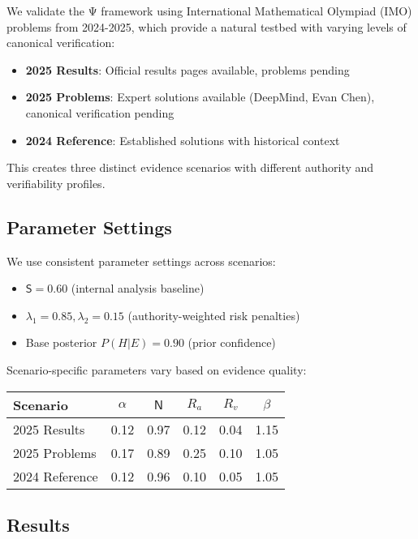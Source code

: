 \documentclass[12pt,a4paper]{article}
\newcommand{\Ssig}{\mathsf{S}}
\newcommand{\Nsig}{\mathsf{N}}
\newcommand{\alloc}{\alpha}
\newcommand{\rA}{R_a}
\newcommand{\rV}{R_v}
\newcommand{\lA}{\lambda_1}
\newcommand{\lV}{\lambda_2}
\newcommand{\uplift}{\beta}
\begin{document}
We validate the Ψ framework using International Mathematical Olympiad (IMO) problems from 2024-2025, which provide a natural testbed with varying levels of canonical verification:

\begin{itemize}
\item \textbf{2025 Results}: Official results pages available, problems pending
\item \textbf{2025 Problems}: Expert solutions available (DeepMind, Evan Chen), canonical verification pending  
\item \textbf{2024 Reference}: Established solutions with historical context
\end{itemize}

This creates three distinct evidence scenarios with different authority and verifiability profiles.

\subsection{Parameter Settings}

We use consistent parameter settings across scenarios:
\begin{itemize}
\item $\Ssig = 0.60$ (internal analysis baseline)
\item $\lA = 0.85, \lV = 0.15$ (authority-weighted risk penalties)
\item Base posterior $P(H|E) = 0.90$ (prior confidence)
\end{itemize}

Scenario-specific parameters vary based on evidence quality:

\begin{center}
\begin{tabular}{@{}lccccc@{}}
\toprule
Scenario & $\alloc$ & $\Nsig$ & $\rA$ & $\rV$ & $\uplift$ \\
\midrule
2025 Results & 0.12 & 0.97 & 0.12 & 0.04 & 1.15 \\
2025 Problems & 0.17 & 0.89 & 0.25 & 0.10 & 1.05 \\
2024 Reference & 0.12 & 0.96 & 0.10 & 0.05 & 1.05 \\
\bottomrule
\end{tabular}
\end{center}

\subsection{Results}
\end{document}
